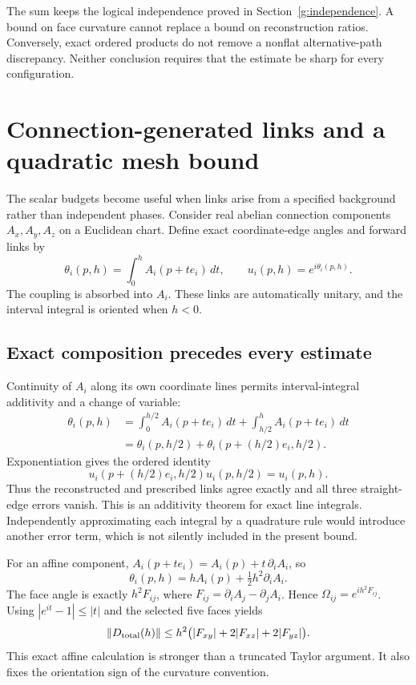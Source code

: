 The sum keeps the logical independence proved in Section~\ref{g:independence}. A bound on face curvature cannot replace a bound on reconstruction ratios. Conversely, exact ordered products do not remove a nonflat alternative-path discrepancy. Neither conclusion requires that the estimate be sharp for every configuration.



\section{Connection-generated links and a quadratic mesh bound}
\label{g:regular}
The scalar budgets become useful when links arise from a specified background rather than independent phases. Consider real abelian connection components $A_x,A_y,A_z$ on a Euclidean chart. Define exact coordinate-edge angles and forward links by
\begin{equation}
 \theta_i(p,h)=\int_0^h A_i(p+t e_i)\,dt,
 \qquad u_i(p,h)=e^{i\theta_i(p,h)}.
 \label{g:integrated-links}
\end{equation}
The coupling is absorbed into $A_i$. These links are automatically unitary, and the interval integral is oriented when $h<0$.

\subsection{Exact composition precedes every estimate}
Continuity of $A_i$ along its own coordinate lines permits interval-integral additivity and a change of variable:
\begin{align*}
 \theta_i(p,h)
 &=\int_0^{h/2}A_i(p+t e_i)\,dt
   +\int_{h/2}^{h}A_i(p+t e_i)\,dt\\
 &=\theta_i(p,h/2)+\theta_i(p+(h/2)e_i,h/2).
\end{align*}
Exponentiation gives the ordered identity
\begin{equation}
 u_i(p+(h/2)e_i,h/2)u_i(p,h/2)=u_i(p,h).
 \label{g:integral-composition}
\end{equation}
Thus the reconstructed and prescribed links agree exactly and all three straight-edge errors vanish. This is an additivity theorem for exact line integrals. Independently approximating each integral by a quadrature rule would introduce another error term, which is not silently included in the present bound.

For an affine component, $A_i(p+t e_i)=A_i(p)+t\,\partial_iA_i$, so
\[
 \theta_i(p,h)=hA_i(p)+\tfrac12h^2\partial_iA_i.
\]
The face angle is exactly $h^2F_{ij}$, where $F_{ij}=\partial_iA_j-\partial_jA_i$. Hence $\Omega_{ij}=e^{ih^2F_{ij}}$. Using $|e^{it}-1|\leq|t|$ and the selected five faces yields
\begin{equation}
 \left\lVert D_{\rm total}(h)\right\rVert
 \leq h^2\bigl(|F_{xy}|+2|F_{xz}|+2|F_{yz}|\bigr).
 \label{g:affine-bound}
\end{equation}
This exact affine calculation is stronger than a truncated Taylor argument. It also fixes the orientation sign of the curvature convention.

